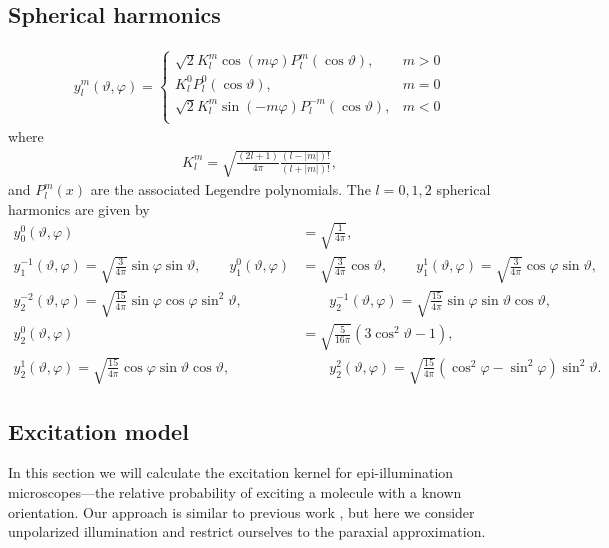 \documentclass{osa-article}
\begin{document}
\subsection{Spherical harmonics}\label{sec:sph}
\begin{align}
  y_l^m(\vartheta, \varphi) =
  \begin{cases}
    \sqrt{2}K_l^m\cos(m\varphi)P_l^m(\cos\vartheta), & m > 0\\
    K_l^0P_l^0(\cos\vartheta), & m = 0\\
    \sqrt{2}K_l^m\sin(-m\varphi)P_l^{-m}(\cos\vartheta), & m < 0\\
  \end{cases}
\end{align}
where
\begin{align}
  K_l^m = \sqrt{\frac{(2l+1)}{4\pi}\frac{(l-|m|)!}{(l+|m|)!}},
\end{align}
and $P_l^m(x)$ are the associated Legendre polynomials. The $l=0, 1, 2$
spherical harmonics are given by
\begin{align}
  y_0^0(\vartheta, \varphi) &= \sqrt{\frac{1}{4\pi}}, \nonumber \\ 
  y_1^{-1}(\vartheta, \varphi) = \sqrt{\frac{3}{4\pi}}\sin\varphi\sin\vartheta, \hspace{2em} y_1^0(\vartheta, \varphi) &= \sqrt{\frac{3}{4\pi}}\cos\vartheta, \hspace{2em} y_1^1(\vartheta, \varphi) = \sqrt{\frac{3}{4\pi}}\cos\varphi\sin\vartheta, \nonumber \\
  y_2^{-2}(\vartheta, \varphi) = \sqrt{\frac{15}{4\pi}}\sin\varphi\cos\varphi\sin^2\vartheta, &\hspace{2em} y_2^{-1}(\vartheta, \varphi) = \sqrt{\frac{15}{4\pi}}\sin\varphi\sin\vartheta\cos\vartheta,\nonumber \\
  y_2^0(\vartheta, \varphi) &= \sqrt{\frac{5}{16\pi}}(3\cos^2\vartheta - 1), \nonumber \\ 
  y_2^{1}(\vartheta, \varphi) = \sqrt{\frac{15}{4\pi}}\cos\varphi\sin\vartheta\cos\vartheta, &\hspace{2em} y_2^{2}(\vartheta, \varphi) = \sqrt{\frac{15}{4\pi}}(\cos^2\varphi - \sin^2\varphi)\sin^2\vartheta.\label{eq:harmonics}
\end{align}

\subsection{Excitation model}
In this section we will calculate the excitation kernel for epi-illumination
microscopes---the relative probability of exciting a molecule with a known
orientation. Our approach is similar to previous work \cite{fourkas2001,  chandler2017},
but here we consider unpolarized illumination and restrict
ourselves to the paraxial approximation.
\end{document}
